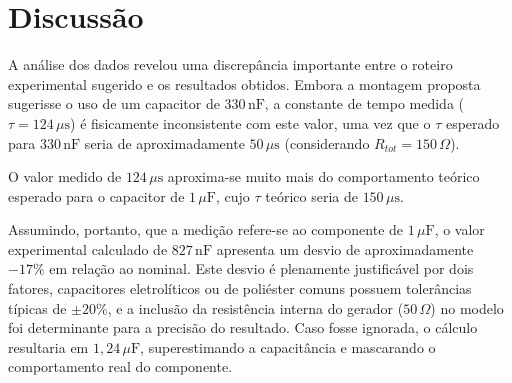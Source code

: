 \section{Discussão}

A análise dos dados revelou uma discrepância importante entre o roteiro experimental sugerido e os resultados obtidos. Embora a montagem proposta sugerisse o uso de um capacitor de $330 \, \text{nF}$, a constante de tempo medida ($\tau = 124 \, \mu\text{s}$) é fisicamente inconsistente com este valor, uma vez que o $\tau$ esperado para $330 \, \text{nF}$ seria de aproximadamente $50 \, \mu\text{s}$ (considerando $R_{tot}=150\,\Omega$).

O valor medido de $124 \, \mu\text{s}$ aproxima-se muito mais do comportamento teórico esperado para o capacitor de \textbf{$1 \, \mu\text{F}$}, cujo $\tau$ teórico seria de $150 \, \mu\text{s}$.

Assumindo, portanto, que a medição refere-se ao componente de $1 \, \mu\text{F}$, o valor experimental calculado de \textbf{$827 \, \text{nF}$} apresenta um desvio de aproximadamente $-17\%$ em relação ao nominal. Este desvio é plenamente justificável por dois fatores, capacitores eletrolíticos ou de poliéster comuns possuem tolerâncias típicas de $\pm 20\%$, e a inclusão da resistência interna do gerador ($50 \, \Omega$) no modelo foi determinante para a precisão do resultado. Caso fosse ignorada, o cálculo resultaria em $1,24 \, \mu\text{F}$, superestimando a capacitância e mascarando o comportamento real do componente.
